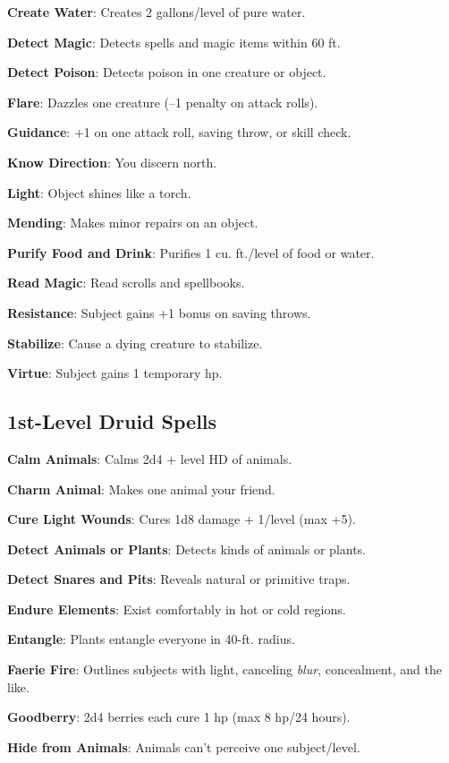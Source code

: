 \textbf{Create Water}: Creates 2 gallons/level of pure water.

\textbf{Detect Magic}: Detects spells and magic items within 60 ft.

\textbf{Detect Poison}: Detects poison in one creature or object.

\textbf{Flare}: Dazzles one creature (--1 penalty on attack rolls).

\textbf{Guidance}: +1 on one attack roll, saving throw, or skill check.

\textbf{Know Direction}: You discern north.

\textbf{Light}: Object shines like a torch.

\textbf{Mending}: Makes minor repairs on an object.

\textbf{Purify Food and Drink}: Purifies 1 cu. ft./level of food or water.

\textbf{Read Magic}: Read scrolls and spellbooks.

\textbf{Resistance}: Subject gains +1 bonus on saving throws.

\textbf{Stabilize}: Cause a dying creature to stabilize.

\textbf{Virtue}: Subject gains 1 temporary hp.

\subsection{1st-Level Druid Spells}


\textbf{Calm Animals}: Calms 2d4 + level HD of animals.

\textbf{Charm Animal}: Makes one animal your friend.

\textbf{Cure Light Wounds}: Cures 1d8 damage + 1/level (max +5).

\textbf{Detect Animals or Plants}: Detects kinds of animals or plants.

\textbf{Detect Snares and Pits}: Reveals natural or primitive traps.

\textbf{Endure Elements}: Exist comfortably in hot or cold regions.

\textbf{Entangle}: Plants entangle everyone in 40-ft. radius.

\textbf{Faerie Fire}: Outlines subjects with light, canceling \textit{blur}, concealment, and the like.

\textbf{Goodberry}: 2d4 berries each cure 1 hp (max 8 hp/24 hours).

\textbf{Hide from Animals}: Animals can't perceive one subject/level.


